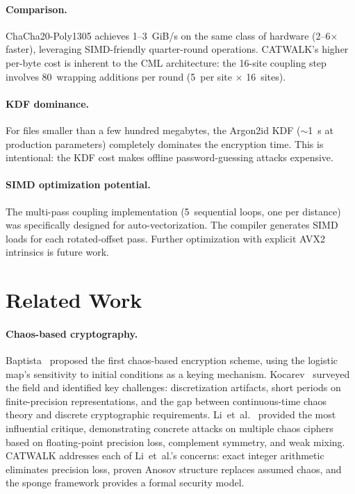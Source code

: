 \documentclass[runningheads]{llncs}
\begin{document}
\paragraph{Comparison.}
ChaCha20-Poly1305 achieves 1--3~GiB/s on the same class of hardware
(2--6$\times$ faster), leveraging SIMD-friendly quarter-round operations.
CATWALK's higher per-byte cost is inherent to the CML architecture: the
16-site coupling step involves 80~wrapping additions per round (5~per site
$\times$ 16~sites).

\paragraph{KDF dominance.}
For files smaller than a few hundred megabytes, the Argon2id KDF ($\sim$1~s
at production parameters) completely dominates the encryption time.  This is
intentional: the KDF cost makes offline password-guessing attacks expensive.

\paragraph{SIMD optimization potential.}
The multi-pass coupling implementation (5~sequential loops, one per distance)
was specifically designed for auto-vectorization.  The compiler generates
SIMD loads for each rotated-offset pass.  Further optimization with explicit
AVX2 intrinsics is future work.

\section{Related Work}
\label{sec:related}

\paragraph{Chaos-based cryptography.}
Baptista~\cite{baptista1998cryptography} proposed the first chaos-based
encryption scheme, using the logistic map's sensitivity to initial conditions
as a keying mechanism.  Kocarev~\cite{kocarev2001chaos} surveyed the field
and identified key challenges: discretization artifacts, short periods on
finite-precision representations, and the gap between continuous-time chaos
theory and discrete cryptographic requirements.
Li~et~al.~\cite{li2001problems} provided the most influential critique,
demonstrating concrete attacks on multiple chaos ciphers based on
floating-point precision loss, complement symmetry, and weak mixing.
CATWALK addresses each of Li~et~al.'s concerns: exact integer arithmetic
eliminates precision loss, proven Anosov structure replaces assumed chaos,
and the sponge framework provides a formal security model.
\end{document}
